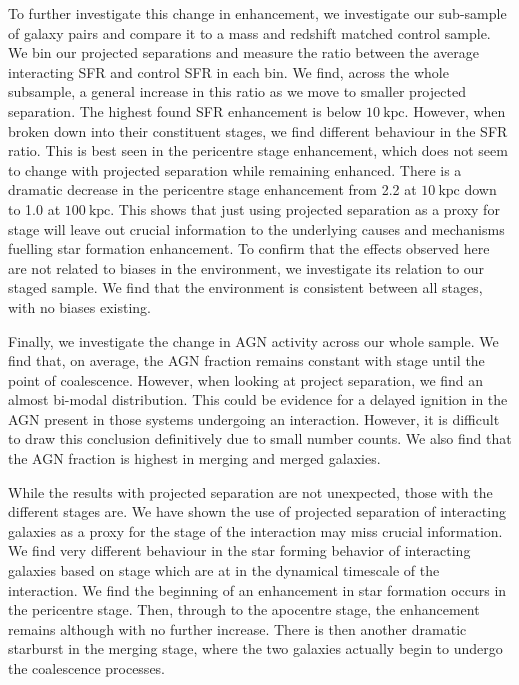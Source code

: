 To further investigate this change in enhancement, we investigate our sub-sample of galaxy pairs and compare it to a mass and redshift matched control sample. We bin our projected separations and measure the ratio between the average interacting SFR and control SFR in each bin. We find, across the whole subsample, a general increase in this ratio as we move to smaller projected separation. The highest found SFR enhancement is below $10~\mathrm{kpc}$. However, when broken down into their constituent stages, we find different behaviour in the SFR ratio. This is best seen in the pericentre stage enhancement, which does not seem to change with projected separation while remaining enhanced. There is a dramatic decrease in the pericentre stage enhancement from 2.2 at $10~\mathrm{kpc}$ down to 1.0 at $100~\mathrm{kpc}$. This shows that just using projected separation as a proxy for stage will leave out crucial information to the underlying causes and mechanisms fuelling star formation enhancement. To confirm that the effects observed here are not related to biases in the environment, we investigate its relation to our staged sample. We find that the environment is consistent between all stages, with no biases existing.

Finally, we investigate the change in AGN activity across our whole sample. We find that, on average, the AGN fraction remains constant with stage until the point of coalescence. However, when looking at project separation, we find an almost bi-modal distribution. This could be evidence for a delayed ignition in the AGN present in those systems undergoing an interaction. However, it is difficult to draw this conclusion definitively due to small number counts. We also find that the AGN fraction is highest in merging and merged galaxies.

While the results with projected separation are not unexpected, those with the different stages are. We have shown the use of projected separation of interacting galaxies as a proxy for the stage of the interaction may miss crucial information. We find very different behaviour in the star forming behavior of interacting galaxies based on stage which are at in the dynamical timescale of the interaction. We find the beginning of an enhancement in star formation occurs in the pericentre stage. Then, through to the apocentre stage, the enhancement remains although with no further increase. There is then another dramatic starburst in the merging stage, where the two galaxies actually begin to undergo the coalescence processes.

